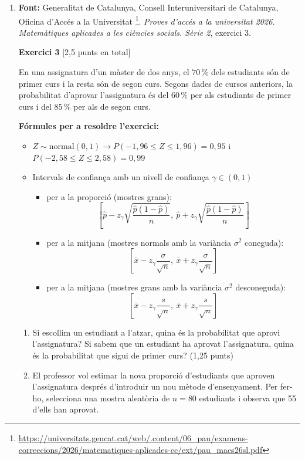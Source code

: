 \begin{enumerate}
\begin{enumerate}[a)]
\end{enumerate}
\vspace{2cm}

\item \textbf{Font:} Generalitat de Catalunya, Consell Interuniversitari de Catalunya, Oficina d'Accés a la Universitat \footnote{\url{https://universitats.gencat.cat/web/.content/06_pau/examens-correccions/2026/matematiques-aplicades-cc/ext/pau_macs26sl.pdf}}. \textit{Proves d'accés a la universitat 2026. Matemàtiques aplicades a les ciències socials. Sèrie 2}, exercici 3.

\textbf{Exercici 3} \hfill [2,5 punts en total]

En una assignatura d'un màster de dos anys, el $70\,\%$ dels estudiants són de primer curs i la resta són de segon curs. Segons dades de cursos anteriors, la probabilitat d'aprovar l'assignatura és del $60\,\%$ per als estudiants de primer curs i del $85\,\%$ per als de segon curs.

\textbf{Fórmules per a resoldre l'exercici:}
\begin{itemize}
 \item $Z \sim \mbox{normal}(0,1) \rightarrow P(-1{,}96 \leq Z \leq 1{,}96) = 0{,}95$ i $P(-2{,}58 \leq Z \leq 2{,}58) = 0{,}99$
 \item Intervals de confiança amb un nivell de confiança $\gamma \in (0,1)$
 \begin{itemize}
  \item[---] per a la proporció (mostres grans):
  $$\left[\hat{p}-z_{\gamma}\sqrt{\frac{\hat{p}(1-\hat{p})}{n}},\ \hat{p}+z_{\gamma}\sqrt{\frac{\hat{p}(1-\hat{p})}{n}}\right]$$
  \item[---] per a la mitjana (mostres normals amb la variància $\sigma^2$ coneguda):
  $$\left[\bar{x}-z_{\gamma}\frac{\sigma}{\sqrt{n}},\ \bar{x}+z_{\gamma}\frac{\sigma}{\sqrt{n}}\right]$$
  \item[---] per a la mitjana (mostres grans amb la variància $\sigma^2$ desconeguda):
  $$\left[\bar{x}-z_{\gamma}\frac{s}{\sqrt{n}},\ \bar{x}+z_{\gamma}\frac{s}{\sqrt{n}}\right]$$
 \end{itemize}
\end{itemize}
\vspace{2cm}

\begin{enumerate}[3.1.]
 \item Si escollim un estudiant a l'atzar, quina és la probabilitat que aprovi l'assignatura? Si sabem que un estudiant ha aprovat l'assignatura, quina és la probabilitat que sigui de primer curs? (1,25 punts)
 \item El professor vol estimar la nova proporció d'estudiants que aproven l'assignatura després d'introduir un nou mètode d'ensenyament. Per fer-ho, selecciona una mostra aleatòria de $n = 80$ estudiants i observa que 55 d'ells han aprovat.


\end{enumerate}
\end{enumerate}
